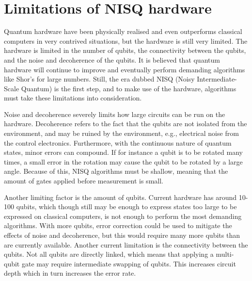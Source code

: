 \section{Limitations of NISQ hardware}
Quantum hardware have been physically realised and even outperforms classical computers in very contrived situations, but the hardware is still very limited.
The hardware is limited in the number of qubits, the connectivity between the qubits, and the noise and decoherence of the qubits.
It is believed that quantum hardware will continue to improve and eventually perform demanding algorithms like Shor's for large numbers.
Still, the era dubbed NISQ (Noisy Intermediate-Scale Quantum) is the first step, and to make use of the hardware, algorithms must take these limitations into consideration.

Noise and decoherence severely limits how large circuits can be run on the hardware.
Decoherence refers to the fact that the qubits are not isolated from the environment, and may be ruined by the environment, e.g., electrical noise from the control electronics.
Furthermore, with the continuous nature of quantum states, minor errors can compound.
If for instance a qubit is to be rotated many times, a small error in the rotation may cause the qubit to be rotated by a large angle.
Because of this, NISQ algorithms must be shallow, meaning that the amount of gates applied before measurement is small.

Another limiting factor is the amount of qubits.
Current hardware has around 10-100 qubits, which though still may be enough to express states too large to be expressed on classical computers, is not enough to perform the most demanding algorithms.
With more qubits, error correction could be used to mitigate the effects of noise and decoherence, but this would require many more qubits than are currently available.
Another current limitation is the connectivity between the qubits.
Not all qubits are directly linked, which means that applying a multi-qubit gate may require intermediate swapping of qubits.
This increases circuit depth which in turn increases the error rate.